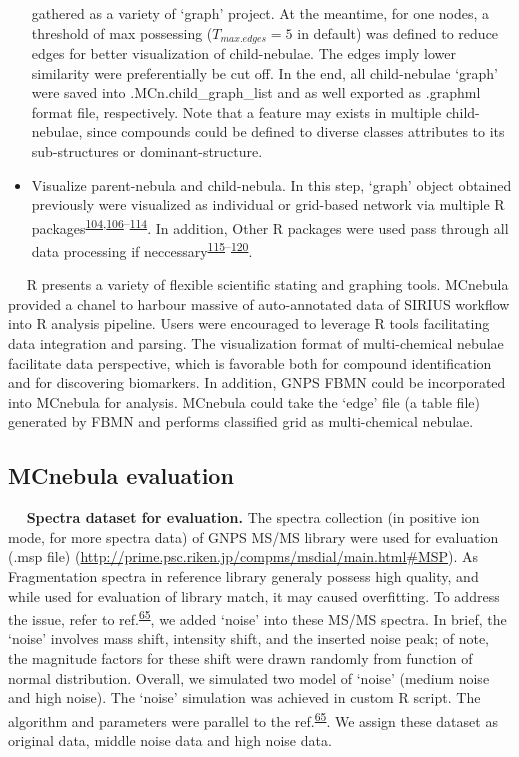 \begin{itemize}
  gathered as a variety of `graph' project. At the meantime, for one
  nodes, a threshold of max possessing (\(T_{max.edges} = 5\) in
  default) was defined to reduce edges for better visualization of
  child-nebulae. The edges imply lower similarity were preferentially be
  cut off. In the end, all child-nebulae `graph' were saved into
  .MCn.child\_graph\_list and as well exported as .graphml format file,
  respectively. Note that a feature may exists in multiple
  child-nebulae, since compounds could be defined to diverse classes
  attributes to its sub-structures or dominant-structure.
\item
  Visualize parent-nebula and child-nebula. In this step, `graph' object
  obtained previously were visualized as individual or grid-based
  network via multiple R
  packages\textsuperscript{\protect\hyperlink{ref-2006b}{104},\protect\hyperlink{ref-2016g}{106}--\protect\hyperlink{ref-2020u}{114}}.
  In addition, Other R packages were used pass through all data
  processing if
  neccessary\textsuperscript{\protect\hyperlink{ref-2021x}{115}--\protect\hyperlink{ref-2022e}{120}}.
\end{itemize}

   R presents a variety of flexible scientific stating and graphing
tools. MCnebula provided a chanel to harbour massive of auto-annotated
data of SIRIUS workflow into R analysis pipeline. Users were encouraged
to leverage R tools facilitating data integration and parsing. The
visualization format of multi-chemical nebulae facilitate data
perspective, which is favorable both for compound identification and for
discovering biomarkers. In addition, GNPS FBMN could be incorporated
into MCnebula for analysis. MCnebula could take the `edge' file (a table
file) generated by FBMN and performs classified grid as multi-chemical
nebulae.

\hypertarget{mcnebula-evaluation}{%
\subsection{\texorpdfstring{\textbf{MCnebula
evaluation}}{MCnebula evaluation}}\label{mcnebula-evaluation}}

   \textbf{Spectra dataset for evaluation.} The spectra collection (in
positive ion mode, for more spectra data) of GNPS MS/MS library were
used for evaluation (.msp file)
(\url{http://prime.psc.riken.jp/compms/msdial/main.html\#MSP}). As
Fragmentation spectra in reference library generaly possess high
quality, and while used for evaluation of library match, it may caused
overfitting. To address the issue, refer to
ref.\textsuperscript{\protect\hyperlink{ref-2021}{65}}, we added `noise'
into these MS/MS spectra. In brief, the `noise' involves mass shift,
intensity shift, and the inserted noise peak; of note, the magnitude
factors for these shift were drawn randomly from function of normal
distribution. Overall, we simulated two model of `noise' (medium noise
and high noise). The `noise' simulation was achieved in custom R script.
The algorithm and parameters were parallel to the
ref.\textsuperscript{\protect\hyperlink{ref-2021}{65}}. We assign these
dataset as original data, middle noise data and high noise data.

